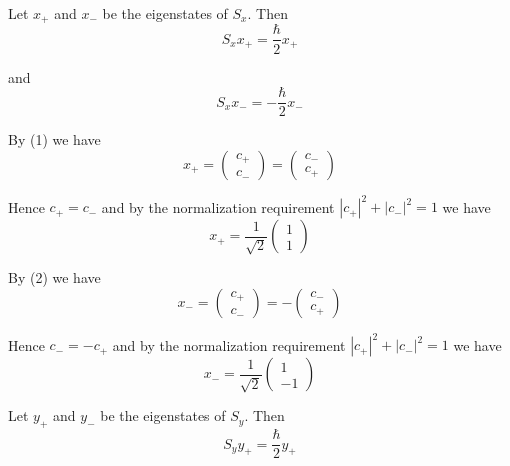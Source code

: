


Let $x_+$ and $x_-$ be the eigenstates of $S_x$. Then
\begin{equation*}
S_xx_+=\frac{\hbar}{2}x_+
\tag{1}
\end{equation*}

and
\begin{equation*}
S_xx_-=-\frac{\hbar}{2}x_-
\tag{2}
\end{equation*}

By (1) we have
\begin{equation*}
x_+=\begin{pmatrix}c_+\\c_-\end{pmatrix}=\begin{pmatrix}c_-\\c_+\end{pmatrix}
\end{equation*}

Hence $c_+=c_-$ and
by the normalization requirement $|c_+|^2+|c_-|^2=1$ we have
\begin{equation*}
x_+=\frac{1}{\sqrt2}\begin{pmatrix}1\\1\end{pmatrix}
\end{equation*}

By (2) we have
\begin{equation*}
x_-=\begin{pmatrix}c_+\\c_-\end{pmatrix}=-\begin{pmatrix}c_-\\c_+\end{pmatrix}
\end{equation*}

Hence $c_-=-c_+$ and
by the normalization requirement $|c_+|^2+|c_-|^2=1$ we have
\begin{equation*}
x_-=\frac{1}{\sqrt2}\begin{pmatrix}1\\-1\end{pmatrix}
\end{equation*}

Let $y_+$ and $y_-$ be the eigenstates of $S_y$. Then
\begin{equation*}
S_yy_+=\frac{\hbar}{2}y_+
\tag{3}
\end{equation*}

